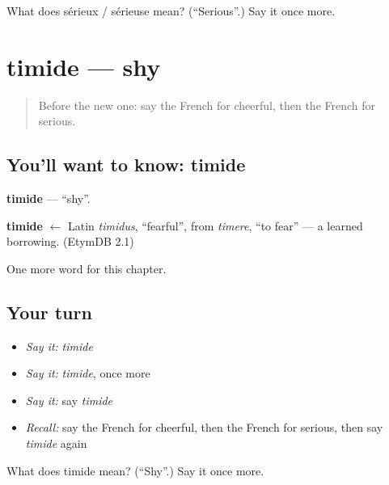 \begin{tcolorbox}[breakable,colback=teal!4,colframe=teal!35!black,title={Before you move on}]
What does sérieux / sérieuse mean? (\textquotedblleft{}Serious\textquotedblright{}.) Say it once more.
\end{tcolorbox}
\section[timide]{timide — shy}

\label{lesson:FR-C190-timide}



\begin{quote}
Before the new one: say the French for cheerful, then the French for serious.
\end{quote}

\subsection*{You'll want to know: timide}
\textbf{timide} — \textquotedblleft{}shy\textquotedblright{}.

\begin{cousinweb}
\textbf{timide} $\leftarrow$ Latin \emph{timidus}, \textquotedblleft{}fearful\textquotedblright{}, from \emph{timere}, \textquotedblleft{}to fear\textquotedblright{} — a learned borrowing. (EtymDB 2.1)
\end{cousinweb}

\begin{grammarlens}[title={What you've built}]
One more word for this chapter.
\end{grammarlens}

\subsection*{Your turn}
\begin{itemize}
\raggedright
  \item \emph{Say it:} \emph{timide}
  \item \emph{Say it:} \emph{timide}, once more
  \item \emph{Say it:} say \emph{timide}
  \item \emph{Recall:} say the French for cheerful, then the French for serious, then say \emph{timide} again
\end{itemize}

\begin{tcolorbox}[breakable,colback=teal!4,colframe=teal!35!black,title={Before you move on}]
What does timide mean? (\textquotedblleft{}Shy\textquotedblright{}.) Say it once more.
\end{tcolorbox}

